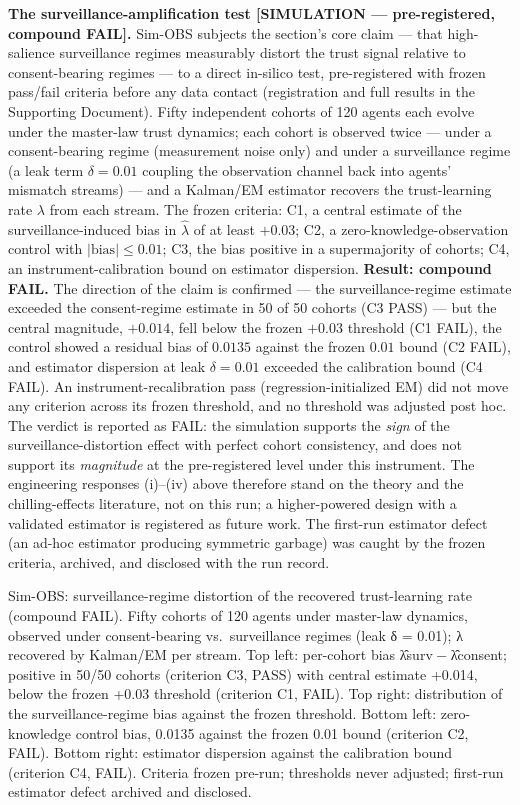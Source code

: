 \documentclass[
]{article}
\begin{document}
\textbf{The surveillance-amplification test {[}SIMULATION ---
pre-registered, compound FAIL{]}.} Sim-OBS subjects the section's core
claim --- that high-salience surveillance regimes measurably distort the
trust signal relative to consent-bearing regimes --- to a direct
in-silico test, pre-registered with frozen pass/fail criteria before any
data contact (registration and full results in the Supporting Document).
Fifty independent cohorts of 120 agents each evolve under the master-law
trust dynamics; each cohort is observed twice --- under a
consent-bearing regime (measurement noise only) and under a surveillance
regime (a leak term \(\delta = 0.01\) coupling the observation channel
back into agents' mismatch streams) --- and a Kalman/EM estimator
recovers the trust-learning rate \(\lambda\) from each stream. The
frozen criteria: C1, a central estimate of the surveillance-induced bias
in \(\hat{\lambda}\) of at least \(+0.03\); C2, a
zero-knowledge-observation control with \(|\mathrm{bias}| \leq
0.01\); C3, the bias positive in a supermajority of cohorts; C4, an
instrument-calibration bound on estimator dispersion. \textbf{Result:
compound FAIL.} The direction of the claim is confirmed --- the
surveillance-regime estimate exceeded the consent-regime estimate in 50
of 50 cohorts (C3 PASS) --- but the central magnitude, \(+0.014\), fell
below the frozen \(+0.03\) threshold (C1 FAIL), the control showed a
residual bias of \(0.0135\) against the frozen \(0.01\) bound (C2 FAIL),
and estimator dispersion at leak \(\delta = 0.01\) exceeded the
calibration bound (C4 FAIL). An instrument-recalibration pass
(regression-initialized EM) did not move any criterion across its frozen
threshold, and no threshold was adjusted post hoc. The verdict is
reported as FAIL: the simulation supports the \emph{sign} of the
surveillance-distortion effect with perfect cohort consistency, and does
not support its \emph{magnitude} at the pre-registered level under this
instrument. The engineering responses (i)--(iv) above therefore stand on
the theory and the chilling-effects literature, not on this run; a
higher-powered design with a validated estimator is registered as future
work. The first-run estimator defect (an ad-hoc estimator producing
symmetric garbage) was caught by the frozen criteria, archived, and
disclosed with the run record.

Sim-OBS: surveillance-regime distortion of the recovered trust-learning
rate (compound FAIL). Fifty cohorts of 120 agents under master-law
dynamics, observed under consent-bearing vs.~surveillance regimes (leak
{δ = 0.01}); {λ} recovered by Kalman/EM per stream. Top left: per-cohort
bias {λ̂surv − λ̂consent}; positive in 50/50 cohorts (criterion C3, PASS)
with central estimate {+0.014}, below the frozen {+0.03} threshold
(criterion C1, FAIL). Top right: distribution of the surveillance-regime
bias against the frozen threshold. Bottom left: zero-knowledge control
bias, {0.0135} against the frozen {0.01} bound (criterion C2, FAIL).
Bottom right: estimator dispersion against the calibration bound
(criterion C4, FAIL). Criteria frozen pre-run; thresholds never
adjusted; first-run estimator defect archived and disclosed.
\end{document}
